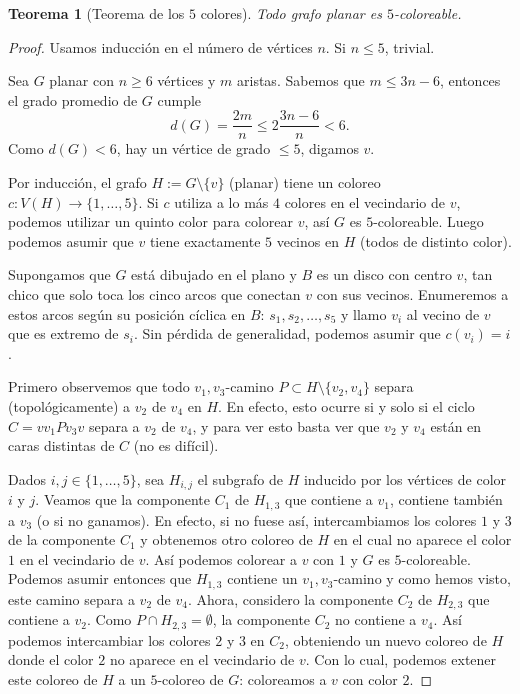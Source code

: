 \documentclass[12pt]{report}
\theoremstyle{plain}
\newtheorem{theorem}{Teorema}[section]
\theoremstyle{definition}
\begin{document}
\begin{theorem}[Teorema de los $5$ colores]\label{th:teorema de los 5-colores - para grafos planares}
Todo grafo planar es $5$-coloreable.
\end{theorem}
\begin{proof}
Usamos inducción en el número de vértices $n$. Si $n \leq 5$, trivial.

Sea $G$ planar con $n \geq 6$ vértices y $m$ aristas. Sabemos que $m \leq 3n -6$, entonces el grado promedio de $G$ cumple
\[
    d(G) = \frac{2 m}{n} \leq 2 \frac{3n - 6}{n} < 6.
\]
Como $d(G) < 6$, hay un vértice de grado $\leq 5$, digamos $v$.

Por inducción, el grafo $H := G \setminus \{v\}$ (planar) tiene un coloreo $c : V(H) \rightarrow \{1, \ldots, 5\}$. Si $c$ utiliza a lo más $4$ colores en el vecindario de $v$, podemos utilizar un quinto color para colorear $v$, así $G$ es $5$-coloreable. Luego podemos asumir que $v$ tiene exactamente $5$ vecinos en $H$ (todos de distinto color).

Supongamos que $G$ está dibujado en el plano y $B$ es un disco con centro $v$, tan chico que solo toca los cinco arcos que conectan $v$ con sus vecinos. Enumeremos a estos arcos según su posición cíclica en $B$: $s_1, s_2, \ldots, s_5$ y llamo $v_i$ al vecino de $v$ que es extremo de $s_i$. Sin pérdida de generalidad, podemos asumir que $c(v_i) = i$.

Primero observemos que todo $v_1,v_3$-camino $P \subset H \setminus \{v_2, v_4\}$ separa (topológicamente) a $v_2$ de $v_4$ en $H$. En efecto, esto ocurre si y solo si el ciclo $C = v v_1 P v_3 v$ separa a $v_2$ de $v_4$, y para ver esto basta ver que $v_2$ y $v_4$ están en caras distintas de $C$ (no es difícil).


Dados $i,j \in \{1, \ldots, 5\}$, sea $H_{i,j}$ el subgrafo de $H$ inducido por los vértices de color $i$ y $j$. Veamos que la componente $C_1$ de $H_{1,3}$ que contiene a $v_1$, contiene también a $v_3$ (o si no ganamos). En efecto, si no fuese así, intercambiamos los colores $1$ y $3$ de la componente $C_1$ y obtenemos otro coloreo de $H$ en el cual no aparece el color $1$ en el vecindario de $v$. Así podemos colorear a $v$ con $1$ y $G$ es $5$-coloreable. Podemos asumir entonces que $H_{1,3}$ contiene un $v_1, v_3$-camino y como hemos visto, este camino separa a $v_2$ de $v_4$. Ahora, considero la componente $C_2$ de $H_{2,3}$ que contiene a $v_2$. Como $P \cap H_{2,3} = \emptyset$, la componente $C_2 $ no contiene a $v_4$. Así podemos intercambiar los colores $2$ y $3$ en $C_2$, obteniendo un nuevo coloreo de $H$ donde el color $2$ no aparece en el vecindario de $v$. Con lo cual, podemos extener este coloreo de $H$ a un $5$-coloreo de $G$: coloreamos a $v$ con color $2$.
\end{proof}
\end{document}

